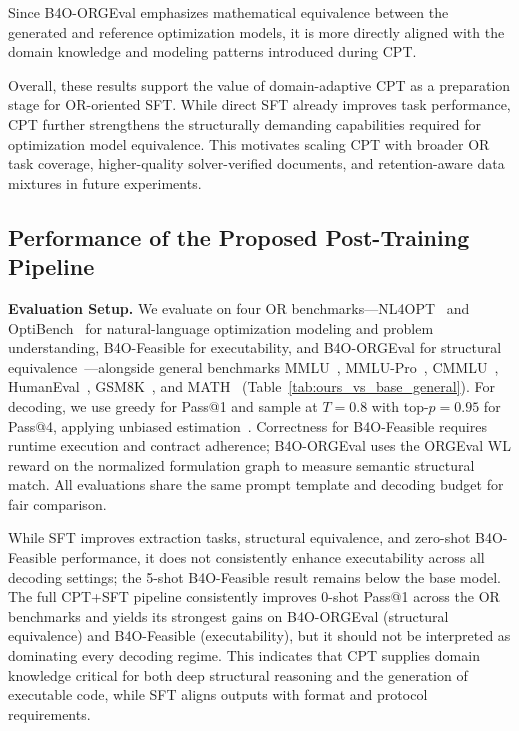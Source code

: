 Since B4O-ORGEval emphasizes mathematical equivalence between the generated and reference optimization models, it is more directly aligned with the domain knowledge and modeling patterns introduced during CPT.

Overall, these results support the value of domain-adaptive CPT as a preparation stage for OR-oriented SFT. While direct SFT already improves task performance, CPT further strengthens the structurally demanding capabilities required for optimization model equivalence. This motivates scaling CPT with broader OR task coverage, higher-quality solver-verified documents, and retention-aware data mixtures in future experiments.


\subsection{Performance of the Proposed Post-Training Pipeline}

\textbf{Evaluation Setup.} We evaluate on four OR benchmarks---NL4OPT~\citep{ramamonjison2023nl4opt} and OptiBench~\citep{yang2025optibench} for natural-language optimization modeling and problem understanding, B4O-Feasible for executability, and B4O-ORGEval for structural equivalence~\citep{orgeval}---alongside general benchmarks MMLU~\citep{hendryckstest2021}, MMLU-Pro~\citep{wang2024mmlu}, CMMLU~\citep{hendryckstest2021}, HumanEval~\citep{chen2021codex}, GSM8K~\citep{cobbe2021gsm8k}, and MATH~\citep{hendrycks2021measuringmathematicalproblemsolving} (Table~\ref{tab:ours_vs_base_general}). For decoding, we use greedy for Pass@1 and sample at $T=0.8$ with top-$p=0.95$ for Pass@4, applying unbiased estimation~\citep{zhao2023unbiased}. Correctness for B4O-Feasible requires runtime execution and contract adherence; B4O-ORGEval uses the ORGEval WL reward on the normalized formulation graph to measure semantic structural match. All evaluations share the same prompt template and decoding budget for fair comparison.


While SFT improves extraction tasks, structural equivalence, and zero-shot B4O-Feasible performance, it does not consistently enhance executability across all decoding settings; the 5-shot B4O-Feasible result remains below the base model. The full CPT+SFT pipeline consistently improves 0-shot Pass@1 across the OR benchmarks and yields its strongest gains on B4O-ORGEval (structural equivalence) and B4O-Feasible (executability), but it should not be interpreted as dominating every decoding regime. This indicates that CPT supplies domain knowledge critical for both deep structural reasoning and the generation of executable code, while SFT aligns outputs with format and protocol requirements.


